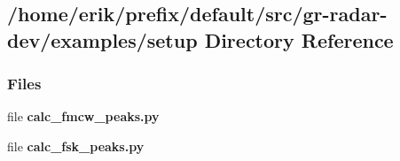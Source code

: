 \subsection{/home/erik/prefix/default/src/gr-\/radar-\/dev/examples/setup Directory Reference}
\label{dir_f8b800e0d1e4f057e2a4a74338490e60}
\subsubsection*{Files}
\begin{DoxyCompactItemize}
\item 
file {\bf calc\+\_\+fmcw\+\_\+peaks.\+py}
\item 
file {\bf calc\+\_\+fsk\+\_\+peaks.\+py}
\end{DoxyCompactItemize}
